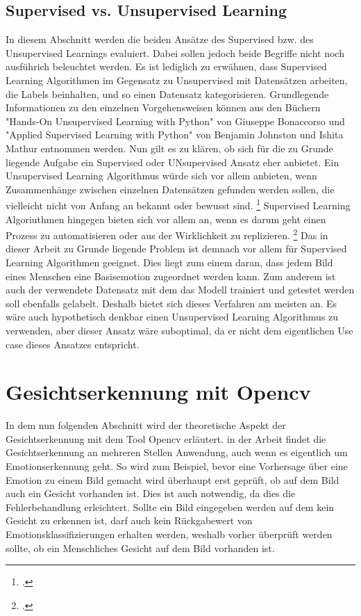 \documentclass[12pt, a4paper]{report}
\begin{document}
\subsection{Supervised vs. Unsupervised Learning}
In diesem Abschnitt werden die beiden Ansätze des Supervised bzw. des Unsupervised Learnings evaluiert. Dabei sollen jedoch beide Begriffe nicht noch ausführich beleuchtet werden. Es ist lediglich zu erwähnen, dass Supervised Learning Algorithmen im Gegensatz zu Unsupervised mit Datensätzen arbeiten, die Labels beinhalten, und so einen Datensatz kategorisieren.  Grundlegende Informationen zu den einzelnen Vorgehensweisen  können aus den Büchern "Hands-On Unsupervised Learning with Python" von Giuseppe Bonaccorso und "Applied Supervised Learning with Python" von Benjamin Johnston und Ishita Mathur entnommen werden.
Nun gilt es zu klären, ob sich für die zu Grunde liegende Aufgabe ein Supervised oder UNsupervised Ansatz eher anbietet. Ein Unsupervised Learning Algorithmus würde sich vor allem anbieten, wenn Zusammenhänge zwischen einzelnen Datensätzen gefunden werden sollen, die vielleicht nicht von Anfang an bekannt oder bewusst sind.
\footcite[Vgl. ][21]{Unsupervised}
 Supervised Learning Algoriuthmen hingegen bieten sich vor allem an, wenn es darum geht einen Prozess zu automatisieren oder aus der Wirklichkeit zu replizieren.
\footcite[Vgl. ][4]{Supervised}
Das in dieser Arbeit zu Grunde liegende Problem ist demnach vor allem für Supervised Learning Algorithmen geeignet. Dies liegt zum einem daran, dass jedem Bild eines Menschen eine Basisemotion zugeordnet werden kann. Zum anderem ist auch der verwendete Datensatz mit dem das Modell trainiert und getestet werden soll ebenfalls gelabelt. Deshalb bietet sich dieses Verfahren am meisten an. Es wäre auch hypothetisch denkbar einen Unsupervised Learning Algorithmus zu verwenden, aber dieser Ansatz wäre suboptimal, da er nicht dem eigentlichen Use case dieses Ansatzes entspricht.

\section{Gesichtserkennung mit Opencv}
In dem nun folgenden Abschnitt wird der theoretische Aspekt der Gesichtserkennung mit dem Tool Opencv erläutert. in der Arbeit findet die Gesichtserkennung an mehreren Stellen Anwendung, auch wenn es eigentlich um Emotionserkennung geht. So wird zum Beispiel, bevor eine Vorhersage über eine Emotion zu einem Bild gemacht wird überhaupt erst geprüft, ob auf dem Bild auch ein Gesicht vorhanden ist. Dies ist auch notwendig, da dies die Fehlerbehandlung erleichtert. Sollte ein Bild eingegeben werden auf dem kein Gesicht zu erkennen ist, darf auch kein Rückgabewert von Emotionsklassifizierungen erhalten werden, weshalb vorher überprüft werden sollte, ob ein Menschliches Gesicht auf dem Bild vorhanden ist.
\end{document}
